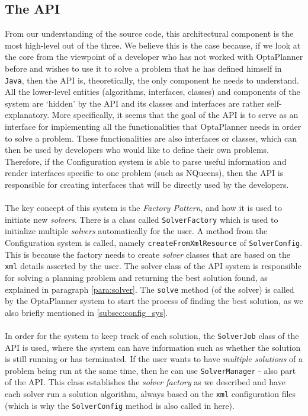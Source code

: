 \subsection{The API}
From our understanding of the source code, this architectural component is the most high-level out of the three. We believe this is the case because, if we look at the core from the viewpoint of a developer who has not worked with OptaPlanner before and wishes to use it to solve a problem that he has defined himself in \verb!Java!, then the API is, theoretically, the only component he needs to understand. All the lower-level entities (algorithms, interfaces, classes) and components of the system are `hidden’ by the API and its classes and interfaces are rather self-explanatory. More specifically, it seems that the goal of the API is to serve as an interface for implementing all the functionalities that OptaPlanner needs in order to solve a problem. These functionalities are also interfaces or classes, which can then be used by developers who would like to define their own problems. Therefore, if the Configuration system is able to parse useful information and render interfaces specific to one problem (such as NQueens), then the API is responsible for creating interfaces that will be directly used by the developers. \\\\
The key concept of this system is the \textit{Factory Pattern}, and how it is used to initiate new \textit{solvers}. There is a class called \verb!SolverFactory! which is used to initialize multiple \textit{solvers} automatically for the user. A method from the Configuration system is called, namely \verb!createFromXmlResource! of \verb!SolverConfig!. This is because the factory needs to create \textit{solver} classes that are based on the \verb!xml! details asserted by the user. The solver class of the API system is responsible for solving a planning problem and returning the best solution found, as explained in paragraph \ref{para:solver}. The \verb!solve! method (of the solver) is called by the OptaPlanner system to start the process of finding the best solution, as we also briefly mentioned in \ref{subsec:config_sys}. \\\\
In order for the system to keep track of each solution, the \verb!SolverJob! class of the API is used, where the system can have information such as whether the solution is still running or has terminated. If the user wants to have \textit{multiple solutions} of a problem being run at the same time, then he can use \verb!SolverManager! - also part of the API. This class establishes the \textit{solver factory} as we described and have each solver run a solution algorithm, always based on the \verb!xml! configuration files (which is why the \verb!SolverConfig! method is also called in here).\\\\
